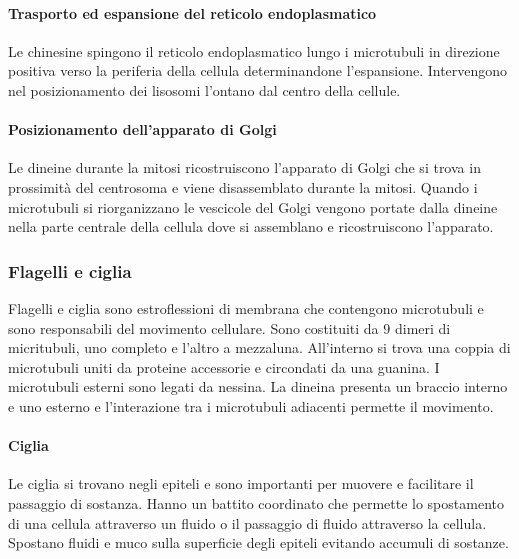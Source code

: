 			\paragraph{Trasporto ed espansione del reticolo endoplasmatico}
			Le chinesine spingono il reticolo endoplasmatico lungo i microtubuli in direzione positiva verso la periferia della cellula determinandone l'espansione.
			Intervengono nel posizionamento dei lisosomi l'ontano dal centro della cellule.

			\paragraph{Posizionamento dell'apparato di Golgi}
			Le dineine durante la mitosi ricostruiscono l'apparato di Golgi che si trova in prossimit\`a del centrosoma e viene disassemblato durante la mitosi.
			Quando i microtubuli si riorganizzano le vescicole del Golgi vengono portate dalla dineine nella parte centrale della cellula dove si assemblano e ricostruiscono l'apparato.

		\subsubsection{Flagelli e ciglia}
		Flagelli e ciglia sono estroflessioni di membrana che contengono microtubuli e sono responsabili del movimento cellulare.
		Sono costituiti da $9$ dimeri di micritubuli, uno completo e l'altro a mezzaluna.
		All'interno si trova una coppia di microtubuli uniti da proteine accessorie e circondati da una guanina.
		I microtubuli esterni sono legati da nessina.
		La dineina presenta un braccio interno e uno esterno e l'interazione tra i microtubuli adiacenti permette il movimento.

			\paragraph{Ciglia}
			Le ciglia si trovano negli epiteli e sono importanti per muovere e facilitare il passaggio di sostanza.
			Hanno un battito coordinato che permette lo spostamento di una cellula attraverso un fluido o il passaggio di fluido attraverso la cellula.
			Spostano fluidi e muco sulla superficie degli epiteli evitando accumuli di sostanze.




